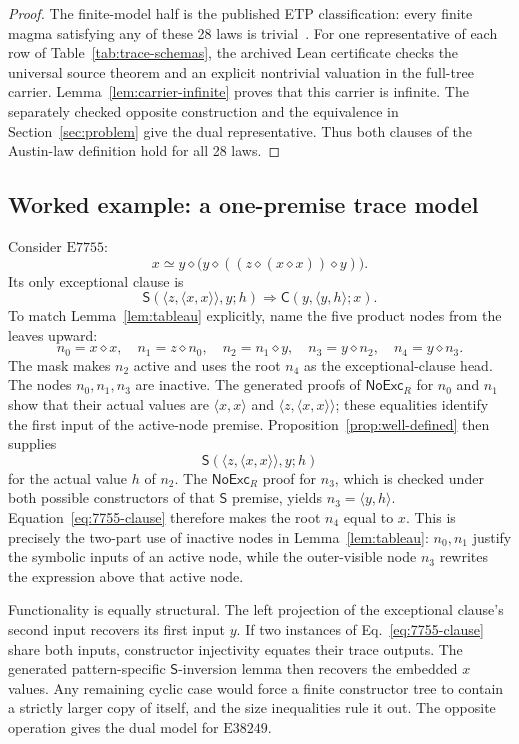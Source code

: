 \documentclass[runningheads]{llncs}
\newcommand{\Law}[1]{\ensuremath{\mathrm{E}#1}}
\newcommand{\op}{\mathbin{\diamond}}
\newcommand{\Code}{\mathsf{C}}
\newcommand{\Step}{\mathsf{S}}
\newcommand{\NoExc}{\mathsf{NoExc}}
\newcommand{\pair}[2]{\langle #1,#2\rangle}
\begin{document}
\begin{proof}
The finite-model half is the published ETP classification: every finite magma
satisfying any of these 28 laws is trivial~\cite{ETPOrder5Austin}.  For one
representative of each row of Table~\ref{tab:trace-schemas}, the archived Lean
certificate checks the universal source theorem and an explicit nontrivial
valuation in the full-tree carrier.  Lemma~\ref{lem:carrier-infinite} proves
that this carrier is infinite.  The separately checked opposite construction
and the equivalence in Section~\ref{sec:problem} give the dual representative.
Thus both clauses of the Austin-law definition hold for all 28 laws.
\end{proof}

\subsection{Worked example: a one-premise trace model}

Consider \Law{7755}:
\[
 x\simeq y\op\bigl(y\op((z\op(x\op x))\op y)\bigr).
\]
Its only exceptional clause is
\begin{equation}
 \Step(\pair{z}{\pair{x}{x}},y;h)
 \Longrightarrow \Code(y,\pair{y}{h};x).
 \label{eq:7755-clause}
\end{equation}
To match Lemma~\ref{lem:tableau} explicitly, name the five product nodes from
the leaves upward:
\[
 n_0=x\op x,\quad n_1=z\op n_0,\quad n_2=n_1\op y,
 \quad n_3=y\op n_2,\quad n_4=y\op n_3.
\]
The mask makes $n_2$ active and uses the root $n_4$ as the exceptional-clause
head.  The nodes $n_0,n_1,n_3$ are inactive.  The generated proofs of
$\NoExc_R$ for $n_0$ and $n_1$ show that their actual values are
$\pair{x}{x}$ and $\pair{z}{\pair{x}{x}}$; these equalities identify the first
input of the active-node premise.  Proposition~\ref{prop:well-defined} then
supplies
\[
 \Step(\pair{z}{\pair{x}{x}},y;h)
\]
for the actual value $h$ of $n_2$.  The $\NoExc_R$ proof for $n_3$, which is
checked under both possible constructors of that $\Step$ premise, yields
$n_3=\pair{y}{h}$.  Equation~\eqref{eq:7755-clause} therefore makes the root
$n_4$ equal to $x$.  This is precisely the two-part use of inactive nodes in
Lemma~\ref{lem:tableau}: $n_0,n_1$ justify the symbolic inputs of an active
node, while the outer-visible node $n_3$ rewrites the expression above that
active node.

Functionality is equally structural.  The left projection of the exceptional
clause's second input recovers its first input $y$.  If two instances of
Eq.~\eqref{eq:7755-clause} share both inputs, constructor injectivity equates
their trace outputs.  The generated pattern-specific $\Step$-inversion lemma
then recovers the embedded $x$ values.  Any remaining cyclic case would force
a finite constructor tree to contain a strictly larger copy of itself, and the
size inequalities rule it out.
The opposite operation gives the dual model for \Law{38249}.
\end{document}
